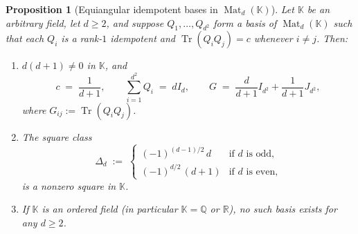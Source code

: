 \documentclass[11pt,reqno]{amsart}
\newtheorem{proposition}[theorem]{Proposition}
\theoremstyle{definition}
\theoremstyle{remark}
\numberwithin{equation}{section}
\newcommand{\KK}{\mathbb{K}}
\newcommand{\QQ}{\mathbb{Q}}
\newcommand{\RR}{\mathbb{R}}
\DeclareMathOperator{\Mat}{Mat}
\DeclareMathOperator{\Tr}{Tr}
\begin{document}
\begin{proposition}[Equiangular idempotent bases in $\Mat_d(\KK)$]\label{prop:equiangular-bases}
Let $\KK$ be an arbitrary field, let $d \ge 2$, and suppose $Q_1, \dots, Q_{d^2}$ form a basis of $\Mat_d(\KK)$ such that each $Q_i$ is a rank-$1$ idempotent and $\Tr(Q_i Q_j) = c$ whenever $i \neq j$. Then:
\begin{enumerate}[label=\textup{(\arabic*)},leftmargin=2em]
  \item $d(d + 1) \neq 0$ in $\KK$, and
  \begin{equation}\label{eq:equiang-params}
    c \;=\; \frac{1}{d + 1}, \qquad \sum_{i=1}^{d^2} Q_i \;=\; d I_d, \qquad G \;=\; \frac{d}{d + 1} I_{d^2} + \frac{1}{d + 1} J_{d^2},
  \end{equation}
  where $G_{ij} := \Tr(Q_i Q_j)$.
  \item The square class
  \begin{equation}\label{eq:Delta-d}
    \Delta_d \;:=\;
    \begin{cases}
      (-1)^{(d - 1)/2}\, d & \text{if } d \text{ is odd,} \\[3pt]
      (-1)^{d/2}\, (d + 1) & \text{if } d \text{ is even,}
    \end{cases}
  \end{equation}
  is a nonzero square in $\KK$.
  \item If $\KK$ is an ordered field (in particular $\KK = \QQ$ or $\RR$), no such basis exists for any $d \ge 2$.
\end{enumerate}
\end{proposition}
\end{document}
